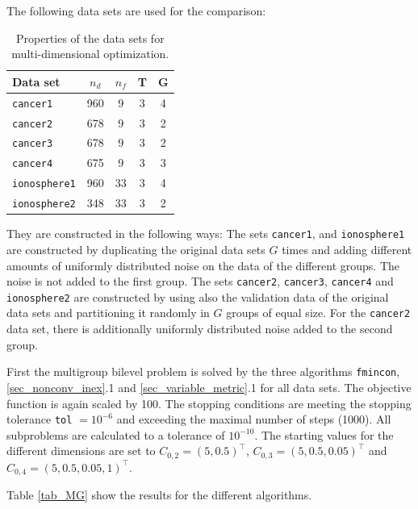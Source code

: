 The following data sets are used for the comparison:

\begin{table}[H]%
\centering
\begin{tabular}{|lcccc|}
	\hline
	Data set & \(n_d\) & \(n_f\) & T & G \\
	\hline
	\texttt{cancer1} & 960 & 9 & 3 & 4\\
	\texttt{cancer2} & 678 & 9 & 3 & 2\\
	\texttt{cancer3} & 678 & 9 & 3 & 2\\
	\texttt{cancer4} & 675 & 9 & 3 & 3\\
	\texttt{ionosphere1} & 960 & 33 & 3 & 4\\
	\texttt{ionosphere2} & 348 & 33 & 3 & 2 \\
	\hline
\end{tabular}
\caption[Properties of data sets, multi-dimensional optimization]{Properties of the data sets for multi-dimensional optimization.}
\label{Prop_mD}
\end{table}

They are constructed in the following ways:
The sets \texttt{cancer1}, and \texttt{ionosphere1} are constructed by duplicating the original data sets \(G\) times and adding different amounts of uniformly distributed noise on the data of the different groups.
The noise is not added to the first group.
The sets \texttt{cancer2}, \texttt{cancer3}, \texttt{cancer4} and \texttt{ionosphere2} are constructed by using also the validation data of the original data sets and partitioning it  randomly in \(G\) groups of equal size.
For the \texttt{cancer2} data set, there is additionally uniformly distributed noise added to the second group.

First the multigroup bilevel problem is solved by the three algorithms \texttt{fmincon}, \ref{sec_nonconv_inex}.1 and \ref{sec_variable_metric}.1 for all data sets. The objective function is again scaled by 100. The stopping conditions are meeting the stopping tolerance \texttt{tol} \(=10^{-6}\) and exceeding the maximal number of steps (1000).
All subproblems are calculated to a  tolerance of \(10^{-10}\).
The starting values for the different dimensions are set to 
\(C_{0,2} = (5,0.5)^{\top}\), \(C_{0,3} = (5,0.5,0.05)^{\top}\) and \(C_{0,4} = (5,0.5,0.05,1)^{\top}\). 

Table \ref{tab_MG} show the results for the different algorithms.


